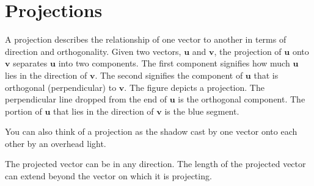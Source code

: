 \chapter{Projections}

A projection describes the relationship of one vector to another in terms of direction and orthogonality. Given two vectors, $\mathbf{u}$ and $\mathbf{v}$, the projection of $\mathbf{u}$ onto $\mathbf{v}$ separates $\mathbf{u}$ into two components. The first component signifies how much $\mathbf{u}$ lies in the direction of $\mathbf{v}$. The second signifies the component of $\mathbf{u}$ that is orthogonal (perpendicular) to $\mathbf{v}$.  The figure depicts a projection. The perpendicular line dropped from the end of $\mathbf{u}$ is the orthogonal component. The portion of $\mathbf{u}$ that lies in the direction of $\mathbf{v}$ is the blue segment. 




You can also think of a projection as the shadow cast by one vector onto each other by an overhead light.



The projected vector can be in any direction. The length of the projected vector can extend beyond the vector on which it is projecting.

